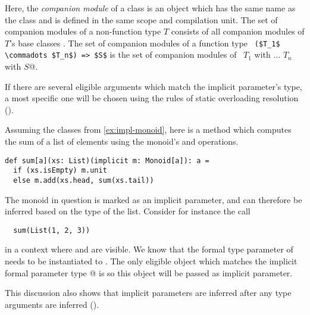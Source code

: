 Here, the {\em companion module} of a class is an object which has the
same name as the class and is defined in the same scope and
compilation unit.  The set of companion modules of a
non-function type $T$ consists of all companion modules of $T$'s base
classes
. The set of companion modules of 
a function type  ~\lstinline~($T_1$ \commadots $T_n$) => $S$~ is the set of 
companion modules of  ~\lstinline@$T_1$ with $\ldots$ $T_n$ with $S$@.  

If there are several eligible arguments which match the implicit
parameter's type, a most specific one will be chosen using the rules
of static overloading resolution ().

\example Assuming the classes from \ref{ex:impl-monoid}, here is a 
method which computes the sum of a list of elements using the
monoid's  and  operations.
\begin{lstlisting}
def sum[a](xs: List)(implicit m: Monoid[a]): a = 
  if (xs.isEmpty) m.unit
  else m.add(xs.head, sum(xs.tail))
\end{lstlisting}
The monoid in question is marked as an implicit parameter, and can therefore
be inferred based on the type of the list.
Consider for instance the call 
\begin{lstlisting}
  sum(List(1, 2, 3))
\end{lstlisting}
in a context where \lstinline@stringMonoid@ and \lstinline@intMonoid@
are visible.  We know that the formal type parameter \lstinline@a@ of
\lstinline@sum@ needs to be instantiated to \lstinline@Int@. The only
eligible object which matches the implicit formal parameter type
\lstinline@Monoid[Int]@ is \lstinline@intMonoid@ so this object will
be passed as implicit parameter.\bigskip

This discussion also shows that implicit parameters are inferred after
any type arguments are inferred (). 

